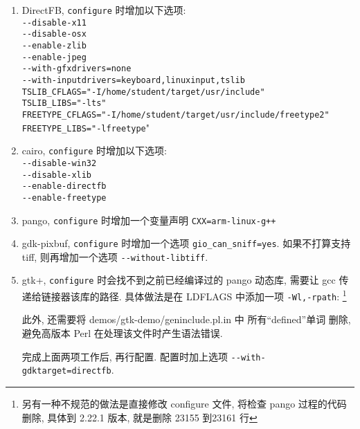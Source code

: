 \begin{enumerate}
    \item DirectFB, \verb|configure| 时增加以下选项:\\
        \verb|--disable-x11|\\
        \verb|--disable-osx|\\
        \verb|--enable-zlib|\\
        \verb|--enable-jpeg|\\
        \verb|--with-gfxdrivers=none|\\
        \verb|--with-inputdrivers=keyboard,linuxinput,tslib|\\
        \verb|TSLIB_CFLAGS="-I/home/student/target/usr/include"|\\
        \verb|TSLIB_LIBS="-lts"|\\
        \verb|FREETYPE_CFLAGS="-I/home/student/target/usr/include/freetype2"|\\
        \verb|FREETYPE_LIBS="-lfreetype|"

  \item cairo,  \verb|configure| 时增加以下选项:\\
      \verb|--disable-win32|\\
      \verb|--disable-xlib|\\
      \verb|--enable-directfb|\\
      \verb|--enable-freetype|

  \item pango, \verb|configure| 时增加一个变量声明 \verb|CXX=arm-linux-g++|

  \item gdk-pixbuf, \verb|configure| 时增加一个选项 \verb|gio_can_sniff=yes|.
      如果不打算支持 tiff, 则再增加一个选项 \verb|--without-libtiff|.

  \item gtk+, \verb|configure| 时会找不到之前已经编译过的 pango 动态库,
      需要让 gcc 传递给链接器该库的路径. 具体做法是在 LDFLAGS 中添加一项
        \verb|-Wl,-rpath|:
      \footnote{另有一种不规范的做法是直接修改 configure 文件, 将检查 pango
      过程的代码删除, 具体到 2.22.1 版本, 就是删除 23155 到23161 行}


     此外, 还需要将 demos/gtk-demo/geninclude.pl.in 中 所有``defined''单词
     删除,避免高版本 Perl 在处理该文件时产生语法错误.

     完成上面两项工作后, 再行配置. 配置时加上选项
     \verb|--with-gdktarget=directfb|.
\end{enumerate}

